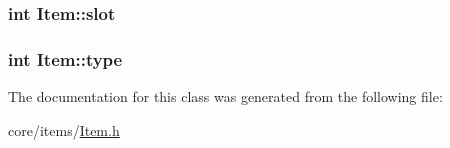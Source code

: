 \hypertarget{classItem_adcfbfc3a87d2112c62b812dac2c72993}{
\subsubsection[{slot}]{\setlength{\rightskip}{0pt plus 5cm}int Item\-::slot\hspace{0.3cm}{\ttfamily [protected]}}}\label{classItem_adcfbfc3a87d2112c62b812dac2c72993}
\hypertarget{classItem_a22a98aed7ce8f0314b597a5739c415b7}{
\subsubsection[{type}]{\setlength{\rightskip}{0pt plus 5cm}int Item\-::type\hspace{0.3cm}{\ttfamily [protected]}}}\label{classItem_a22a98aed7ce8f0314b597a5739c415b7}


The documentation for this class was generated from the following file\-:\begin{DoxyCompactItemize}
\item 
core/items/\hyperlink{Item_8h}{Item.\-h}\end{DoxyCompactItemize}

